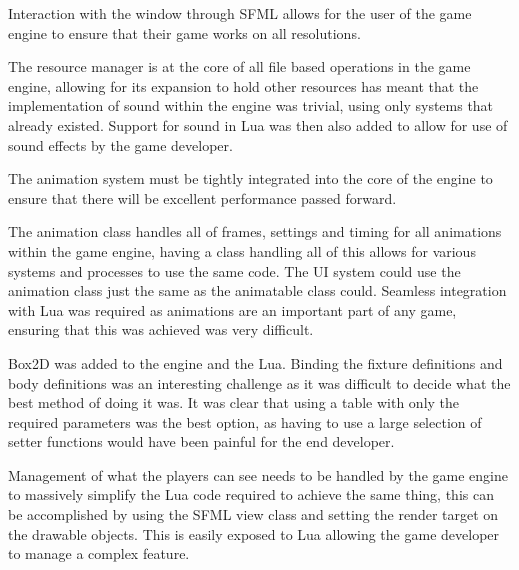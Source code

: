 \documentclass[11pt,a4paper,titlepage]{report}
\begin{document}

   Interaction with the window through SFML allows for the user of the game engine to ensure that their game works on all resolutions.


    The resource manager is at the core of all file based operations in the game engine, allowing for its expansion to hold other resources has meant that the implementation of sound within the engine was trivial, using only systems that already existed. Support for sound in Lua was then also added to allow for use of sound effects by the game developer.


    The animation system must be tightly integrated into the core of the engine to ensure that there will be excellent performance passed forward.

    The animation class handles all of frames, settings and timing for all animations within the game engine, having a class handling all of this allows for various systems and processes to use the same code. The UI system could use the animation class just the same as the animatable class could. Seamless integration with Lua was required as animations are an important part of any game, ensuring that this was achieved was very difficult.


	Box2D was added to the engine and the Lua. Binding the fixture definitions and body definitions was an interesting challenge as it was difficult to decide what the best method of doing it was. It was clear that using a table with only the required parameters was the best option, as having to use a large selection of setter functions would have been painful for the end developer.



    Management of what the players can see needs to be handled by the game engine to massively simplify the Lua code required to achieve the same thing, this can be accomplished by using the SFML view class and setting the render target on the drawable objects. This is easily exposed to Lua allowing the game developer to manage a complex feature.
\end{document}

